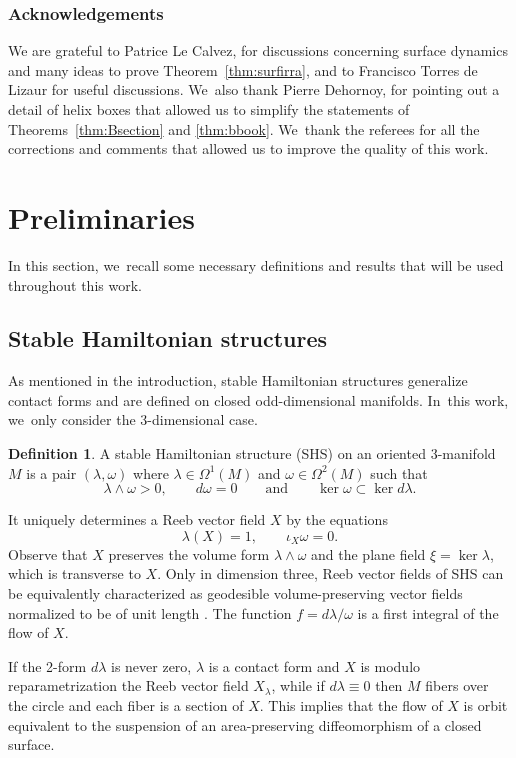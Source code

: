 \documentclass[10pt]{amsart}
\newcommand{\threemanifold}{$3$\nobreakdash-mani\-fold\xspace}
\theoremstyle{definition}
\newtheorem{defi}[theorem]{Definition}
\begin{document}
\subsubsection*{Acknowledgements}
We are grateful to Patrice Le Calvez, for discussions concerning surface dynamics and many ideas to prove Theorem~\ref{thm:surfirra}, and to Francisco Torres de Lizaur for useful discussions. We~also thank Pierre Dehornoy, for pointing out a detail of helix boxes that allowed us to simplify the statements of Theorems~\ref{thm:Bsection} and \ref{thm:bbook}. We~thank the referees for all the corrections and comments that allowed us to improve the quality of this work.

\section{Preliminaries}\label{sec:prelim}

In this section, we~recall some necessary definitions and results that will be used throughout this work.

\subsection{Stable Hamiltonian structures}\label{ss:SHS}

As mentioned in the introduction, stable Hamiltonian structures generalize contact forms and are defined on closed odd-dimensional manifolds. In~this work, we~only consider the 3-dimensional case.

\begin{defi}
A stable Hamiltonian structure (SHS) on an oriented \threemanifold~$M$ is a pair $(\lambda,\omega)$ where $\lambda \in \Omega^1(M)$ and $\omega \in \Omega^2(M)$ such that
\[
\lambda\wedge \omega>0, \qquad d\omega=0 \qquad \mbox{and} \qquad \ker \omega \subset \ker d\lambda.
\]
\end{defi}

It uniquely determines a Reeb vector field $X$ by the equations
\[
\lambda(X)=1,\qquad \iota_X\omega=0.
\]
Observe that $X$ preserves the volume form $\lambda\wedge \omega$ and the plane field $\xi=\ker \lambda$, which is transverse to $X$. Only in dimension three, Reeb vector fields of SHS can be equivalently characterized as geodesible volume-preserving vector fields normalized to be of unit length \cite{Re}. The function $f=d\lambda/\omega$ is a first integral of the flow of $X$.

If the 2-form $d\lambda$ is never zero, $\lambda$ is a contact form and $X$ is modulo reparametrization the Reeb vector field $X_\lambda$, while if $d\lambda\equiv 0$ then $M$ fibers over the circle and each fiber is a section of $X$. This implies that the flow of $X$ is orbit equivalent to
the suspension of an area-preserving diffeomorphism of a closed surface.
\end{document}
